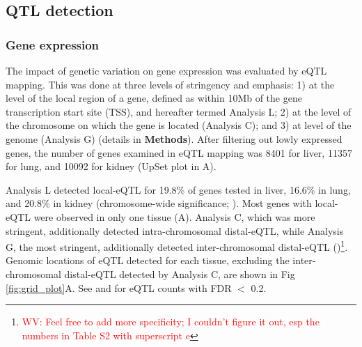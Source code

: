 \documentclass[10pt,letterpaper]{article}
\newcommand{\WV}[2]{\textcolor{red}{#1\footnote{\textcolor{red}{WV: #2}}}}
\begin{document}
\subsection*{QTL detection}

\subsubsection*{Gene expression}
The impact of genetic variation on gene expression was evaluated by eQTL mapping. This was done at three levels of stringency and emphasis: 1) at the level of the local region of a gene, defined as within 10Mb of the gene transcription start site (TSS), and hereafter termed Analysis L; 2) at the level of the chromosome on which the gene is located (Analysis C); and 3) at level of the genome (Analysis G) (details in \textbf{Methods}).
After filtering out lowly expressed genes, the number of genes examined in eQTL mapping was 8401 for liver, 11357 for lung, and 10092 for kidney (UpSet plot \cite{Conway2017} in A).

Analysis L detected local-eQTL for 19.8\% of genes tested in liver, 16.6\% in lung, and 20.8\% in kidney (chromosome-wide significance; ).
Most genes with local-eQTL were observed in only one tissue (A).
Analysis C, which was more stringent, additionally detected intra-chromosomal distal-eQTL, while Analysis G, the most stringent, additionally detected inter-chromosomal distal-eQTL ()\WV{}{Feel free to add more specificity; I couldn't figure it out, esp the numbers in Table S2 with superscript e}.
Genomic locations of eQTL detected for each tissue, excluding the inter-chromosomal distal-eQTL detected by Analysis C, are shown in Fig \ref{fig:grid_plot}A. See  and  for eQTL counts with FDR $<$ 0.2.

\end{document}

